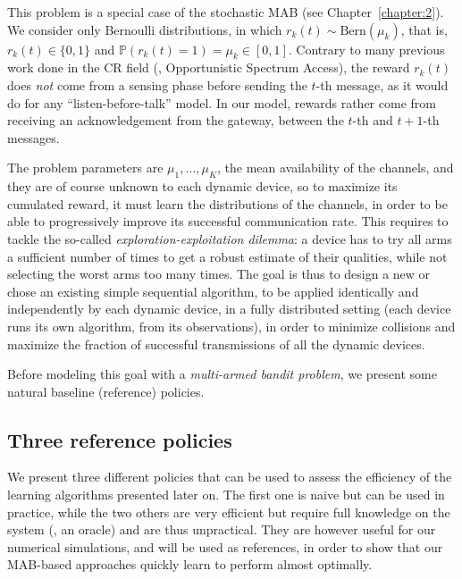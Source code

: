This problem is a special case of the stochastic MAB (see Chapter~\ref{chapter:2}).
We consider only Bernoulli distributions, in which $r_k(t) \sim \mathrm{Bern}(\mu_k)$, that is, $r_k(t) \in \{0,1\}$ and $\mathbb{P}(r_k(t) = 1) = \mu_k \in [0,1]$.
Contrary to many previous work done in the CR field \cite{Jouini10,Jouini12} (\eg, Opportunistic Spectrum Access),
the reward $r_k(t)$ does \emph{not} come from a sensing phase before sending the $t$-th message, as it would do for any ``listen-before-talk'' model.
In our model, rewards rather come from receiving an acknowledgement from the gateway, between the $t$-th and $t+1$-th messages.

The problem parameters are $\mu_1,\dots,\mu_K$, the mean availability of the channels, and they are of course unknown to each dynamic device, so to maximize its cumulated reward, it must learn the distributions of the channels, in order to be able to progressively improve its successful communication rate.
%
This requires to tackle the so-called \emph{exploration-exploitation dilemma}: a device has to try all arms a sufficient number of times to get a robust estimate of their qualities, while not selecting the worst arms too many times.
%
The goal is thus to design a new or chose an existing simple sequential algorithm, to be applied identically and independently by each dynamic device, in a fully distributed setting (each device runs its own algorithm, from its observations), in order to minimize collisions and maximize the fraction of successful transmissions of all the dynamic devices.

Before modeling this goal with a \emph{multi-armed bandit problem}, we present some natural baseline (reference) policies.


\subsection{Three reference policies}\label{sub:41:threeReferencePolicies}

We present three different policies that can be used to assess the efficiency of the learning algorithms presented later on.
The first one is naive but can be used in practice, while the two others are very efficient but require full knowledge on the system (\ie, an oracle) and are thus unpractical.
%
They are however useful for our numerical simulations, and will be used as references, in order to show that our MAB-based approaches quickly learn to perform almost optimally.


